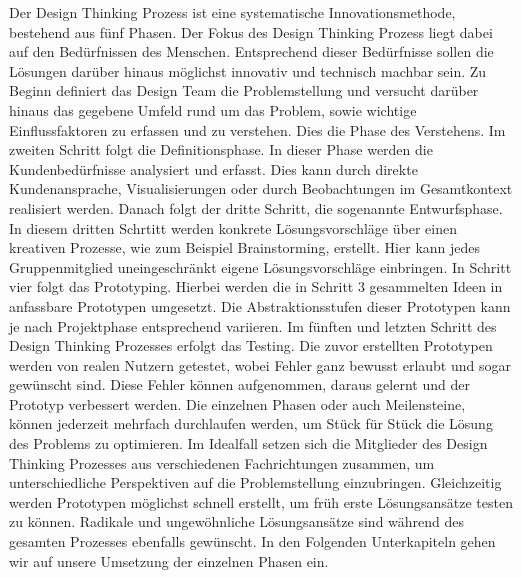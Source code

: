 Der Design Thinking Prozess ist eine systematische Innovationsmethode, bestehend aus fünf Phasen. Der Fokus des Design Thinking Prozess liegt dabei auf den Bedürfnissen des Menschen. Entsprechend dieser Bedürfnisse sollen die Lösungen darüber hinaus möglichst innovativ und technisch machbar sein.
Zu Beginn definiert das Design Team die Problemstellung und versucht darüber hinaus das gegebene Umfeld rund um das Problem, sowie wichtige Einflussfaktoren zu erfassen und zu verstehen. Dies die Phase des Verstehens.
Im zweiten Schritt folgt die Definitionsphase. In dieser Phase werden die Kundenbedürfnisse analysiert und erfasst. Dies kann durch direkte Kundenansprache, Visualisierungen oder durch Beobachtungen im Gesamtkontext realisiert werden.
Danach folgt der dritte Schritt, die sogenannte Entwurfsphase. In diesem dritten Schrtitt werden konkrete Lösungsvorschläge über einen kreativen Prozesse, wie zum Beispiel Brainstorming, erstellt. Hier kann jedes Gruppenmitglied uneingeschränkt eigene Lösungsvorschläge einbringen.
In Schritt vier folgt das Prototyping. Hierbei werden die in Schritt 3 gesammelten Ideen in anfassbare Prototypen umgesetzt. Die Abstraktionsstufen dieser Prototypen kann je nach Projektphase entsprechend variieren.
Im fünften und letzten Schritt des Design Thinking Prozesses erfolgt das Testing. Die zuvor erstellten Prototypen werden von realen Nutzern getestet, wobei Fehler ganz bewusst erlaubt und sogar gewünscht sind. Diese Fehler können aufgenommen, daraus gelernt und der Prototyp verbessert werden. 
Die einzelnen Phasen oder auch Meilensteine, können jederzeit mehrfach durchlaufen werden, um Stück für Stück die Lösung des Problems zu optimieren. Im Idealfall setzen sich die Mitglieder des Design Thinking Prozesses aus verschiedenen Fachrichtungen zusammen, um unterschiedliche Perspektiven auf die Problemstellung einzubringen. Gleichzeitig werden Prototypen möglichst schnell erstellt, um früh erste Lösungsansätze testen zu können. Radikale und ungewöhnliche Lösungsansätze sind während des gesamten Prozesses ebenfalls gewünscht.
In den Folgenden Unterkapiteln gehen wir auf unsere Umsetzung der einzelnen Phasen ein.